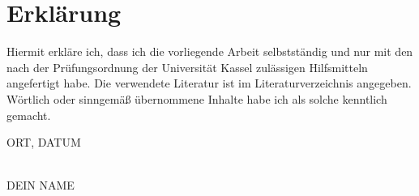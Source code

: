 \chapter*{Erkl\"arung}

Hiermit erkläre ich, dass ich die vorliegende Arbeit selbstständig und nur mit den nach der Prüfungsordnung der Universität Kassel zulässigen Hilfsmitteln angefertigt habe.
Die verwendete Literatur ist im Literaturverzeichnis angegeben. Wörtlich oder sinngemäß übernommene Inhalte habe ich als solche kenntlich gemacht.\\

\vspace{1cm}

ORT, DATUM

\begin{flushright}
  \underline{\hspace{7cm}} \\
  DEIN NAME
\end{flushright}
